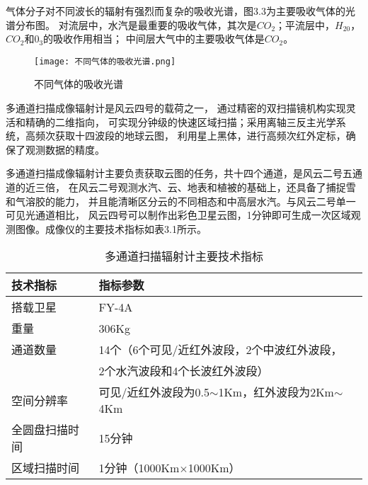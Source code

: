 气体分子对不同波长的辐射有强烈而复杂的吸收光谱，图3.3为主要吸收气体的光谱分布图。
对流层中，水汽是最重要的吸收气体，其次是$CO_2$；平流层中，$H_20$，$CO_2$和$0_3$的吸收作用相当；
中间层大气中的主要吸收气体是$CO_2$。

\begin{figure}[htb]
    \centering
    \texttt{[image: 不同气体的吸收光谱.png]}
    \caption{不同气体的吸收光谱}
\end{figure}

多通道扫描成像辐射计是风云四号的载荷之一，
通过精密的双扫描镜机构实现灵活和精确的二维指向，
可实现分钟级的快速区域扫描；采用离轴三反主光学系统，高频次获取十四波段的地球云图，
利用星上黑体，进行高频次红外定标，确保了观测数据的精度\cite{FY4A}。

多通道扫描成像辐射计主要负责获取云图的任务，共十四个通道，是风云二号五通道的近三倍，
在风云二号观测水汽、云、地表和植被的基础上，还具备了捕捉雪和气溶胶的能力，
并且能清晰区分云的不同相态和中高层水汽。与风云二号单一可见光通道相比，
风云四号可以制作出彩色卫星云图，1分钟即可生成一次区域观测图像。成像仪的主要技术指标如表3.1所示。

\begin{table}[htb]
    \centering\small
    \caption{多通道扫描辐射计主要技术指标}
    \label{tab:exampletable}
    \begin{tabular}{ll}
      \toprule
        技术指标   & 指标参数     \\
      \midrule
      搭载卫星 & FY-4A \\
      重量 & 306Kg   \\
      通道数量 & 14个（6个可见/近红外波段，2个中波红外波段， \\
       & 2个水汽波段和4个长波红外波段）       \\
      空间分辨率 & 可见/近红外波段为0.5$\sim$1Km，红外波段为2Km$\sim$4Km     \\
      全圆盘扫描时间 & 15分钟  \\
      区域扫描时间 & 1分钟（1000Km$\times$1000Km）  \\
      \bottomrule
    \end{tabular}
  \end{table}

